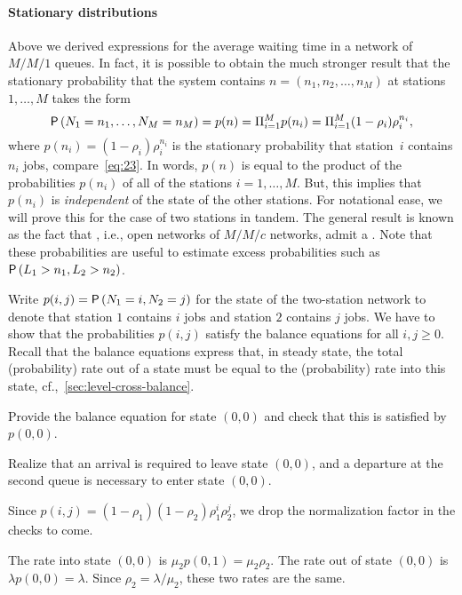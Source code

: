 \paragraph{Stationary distributions}

Above we derived expressions for the average waiting time in a network of $M/M/1$ queues.
In fact, it is possible to obtain the much stronger result that the stationary probability that the system contains $n=(n_1,n_2, \ldots, n_M)$ at stations $1,\ldots, M$ takes the form
\begin{equation*}
  \P{N_1=n_1, \ldots, N_M=n_M} = p(n) = \Pi_{i=1}^M p(n_i) = \Pi_{i=1}^M (1-\rho_i)\rho_i^{n_i},
\end{equation*}
where $p(n_i)=(1-\rho_i)\rho_i^{n_i}$ is the stationary probability that station~$i$ contains $n_i$ jobs, compare~\cref{eq:23}.
In words, $p(n)$ is equal to the product of the probabilities $p(n_i)$ of all of the stations $i=1,\ldots,M$.
But, this implies that $p(n_i)$ is \emph{independent} of the state of the other stations.
For notational ease, we will prove this for the case of two stations in tandem.
The general result is known as the fact that , i.e., open networks of $M/M/c$ networks, admit a .
Note that these probabilities are useful to estimate excess probabilities such as $\P{L_1> n_1, L_2>n_2}$. 


Write $p(i,j)=\P{N_1=i, N_2=j}$ for the state of the two-station network to denote that station $1$ contains $i$ jobs and station $2$ contains $j$ jobs.
We have to show that the probabilities $p(i,j)$ satisfy the balance equations for all $i, j\geq 0$.
Recall that the balance equations express that, in steady state, the total (probability) rate out of a state must be equal to the (probability) rate into this state, cf.,~\cref{sec:level-cross-balance}.

\begin{extra}
  Provide the balance equation for state $(0,0)$ and check that this is satisfied by $p(0,0)$.
\begin{hint}
  Realize that an arrival is required to leave state $(0,0)$, and a departure at the second queue is necessary to enter state $(0,0)$.
\end{hint}
\begin{solution}
  Since $p(i,j) = (1-\rho_1)(1-\rho_2)\rho_1^i \rho_2^j$, we drop the normalization factor in the checks to come.

  The rate into state $(0,0)$ is $\mu_2 p(0,1) = \mu_2 \rho_2$. The rate out of state $(0,0)$ is $\lambda p(0,0) = \lambda$. Since $\rho_2=\lambda/\mu_2$, these two rates are the same.
\end{solution}
\end{extra}

